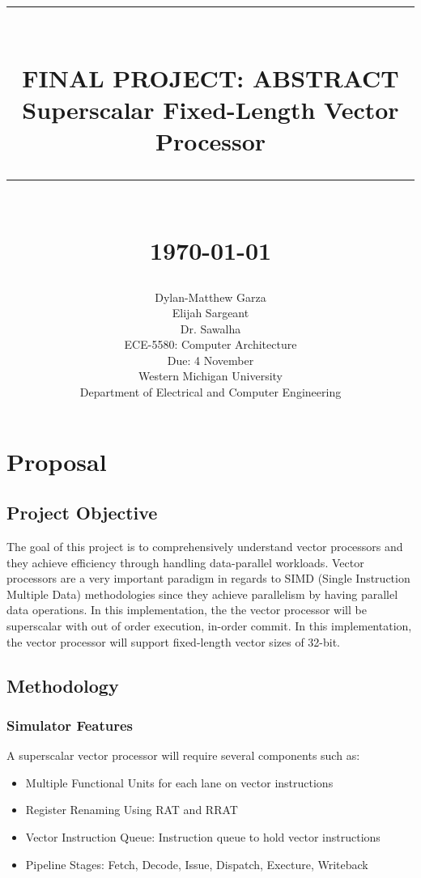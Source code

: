 \documentclass[12pt]{article}
\newcommand{\HRule}[1]{\rule{\linewidth}{#1}}
\newcommand{\Prof}{Dr. Sawalha}
\newcommand{\Class}{ECE-5580: Computer Architecture}
\newcommand{\Assignment}{Final Project: Abstract}
\newcommand{\Specifics}{Superscalar Fixed-Length Vector Processor}
\newcommand{\Due}{Due: 4 November}
\begin{document}
\title{ \normalsize \textsc{}
		\\ [2.0cm]
		\HRule{0.5pt} \\
		\LARGE \textbf{\uppercase{\Assignment}}\\
		\Specifics\\
        \HRule{2pt} \\ [0.5cm]
		\normalsize \today \vspace*{5\baselineskip}}

\date{}

\author{
        Dylan-Matthew Garza \\
        Elijah Sargeant\\ 
        \Prof\\
        \Class\\
        \Due\\
        Western Michigan University \\
        Department of Electrical and Computer Engineering 
    }
\singlespacing
\maketitle
\break
\tableofcontents
\clearpage
{}
\section{Proposal}
\subsection{Project Objective}
The goal of this project is to comprehensively understand vector processors and
they achieve efficiency through handling data-parallel workloads. Vector processors
are a very important paradigm in regards to SIMD (Single Instruction Multiple Data) 
methodologies since they achieve parallelism by having parallel data operations. In this 
implementation, the the vector processor will be superscalar with out of order execution, in-order 
commit. In this implementation, the vector processor will support fixed-length vector sizes
of 32-bit.
\subsection{Methodology}
\subsubsection{Simulator Features}
A superscalar vector processor will require several components such as:
\begin{itemize}
    \item Multiple Functional Units for each lane on vector instructions
    \item Register Renaming Using RAT and RRAT 
    \item Vector Instruction Queue: Instruction queue to hold vector instructions
    \item Pipeline Stages: Fetch, Decode, Issue, Dispatch, Execture, Writeback
\end{itemize}
\end{document}
